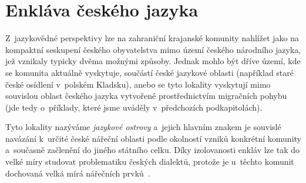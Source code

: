 \hypertarget{enkluxe1va-ux10deskuxe9ho-jazyka}{%
\section{Enkláva českého jazyka}\label{enkluxe1va-ux10deskuxe9ho-jazyka}}

Z~jazykovědné perspektivy lze na zahraniční krajanské komunity nahlížet jako na kompaktní seskupení českého obyvatelstva mimo území českého národního jazyka, jež vznikaly typicky dvěma možnými způsoby. Jednak mohlo být dříve území, kde se komunita aktuálně vyskytuje, součástí české jazykové oblasti (například staré české osídlení v~polském Kladsku), anebo se tyto lokality vyskytují mimo souvislou oblast českého jazyka vytvořené prostřednictvím migračních pohybu (jde tedy o~příklady, které jsme uváděly v~předchozích podkapitolách).

Tyto lokality nazýváme \emph{jazykové ostrovy} a~jejich hlavním znakem je souvislé navázání k~určité české nářeční oblasti podle okolností vzniků konkrétní komunity a~současně začlenění do jiného státního celku. Díky izolovanosti enkláv lze tak do velké míry studovat problematiku českých dialektů, protože je u~těchto komunit dochovaná velká mírá nářečních prvků~\parencite{enklava2017}.
